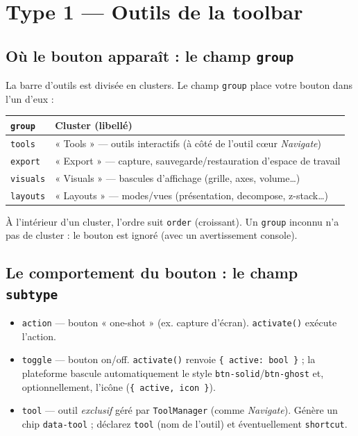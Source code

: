 \documentclass[11pt,a4paper]{article}
\newcommand{\code}[1]{\texttt{#1}}
\begin{document}
\section{Type 1 --- Outils de la toolbar}\label{sec:tools}

\subsection{Où le bouton apparaît : le champ \code{group}}

La barre d'outils est divisée en clusters. Le champ \code{group} place votre
bouton dans l'un d'eux :

\begin{center}
\begin{tabularx}{\linewidth}{@{}l X@{}}
\toprule
\textbf{\code{group}} & \textbf{Cluster (libellé)} \\
\midrule
\code{tools}   & « Tools » --- outils interactifs (à côté de l'outil cœur \emph{Navigate}) \\
\code{export}  & « Export » --- capture, sauvegarde/restauration d'espace de travail \\
\code{visuals} & « Visuals » --- bascules d'affichage (grille, axes, volume\dots) \\
\code{layouts} & « Layouts » --- modes/vues (présentation, decompose, z-stack\dots) \\
\bottomrule
\end{tabularx}
\end{center}

À l'intérieur d'un cluster, l'ordre suit \code{order} (croissant). Un \code{group}
inconnu n'a pas de cluster : le bouton est ignoré (avec un avertissement console).

\subsection{Le comportement du bouton : le champ \code{subtype}}

\begin{itemize}[leftmargin=1.5em]
  \item \code{action} --- bouton « one-shot » (ex. capture d'écran). \code{activate()}
        exécute l'action.
  \item \code{toggle} --- bouton on/off. \code{activate()} renvoie
        \code{\{ active: bool \}} ; la plateforme bascule automatiquement le style
        \code{btn-solid}/\code{btn-ghost} et, optionnellement, l'icône
        (\code{\{ active, icon \}}).
  \item \code{tool} --- outil \emph{exclusif} géré par \code{ToolManager} (comme
        \emph{Navigate}). Génère un chip \code{data-tool} ; déclarez \code{tool}
        (nom de l'outil) et éventuellement \code{shortcut}.
\end{itemize}
\end{document}
